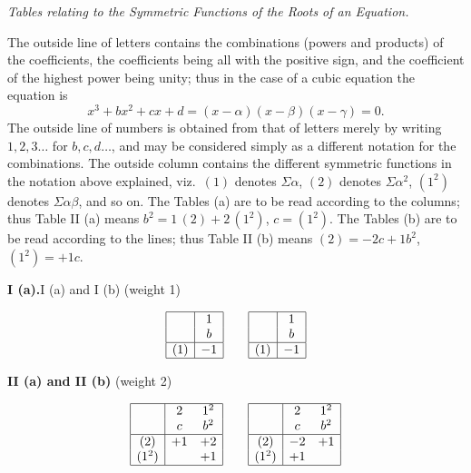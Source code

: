 \documentclass[11pt]{article}
\begin{document}
\bigskip

\begin{center}\textit{Tables relating to the Symmetric Functions of the Roots of an Equation.}\end{center}

\medskip

The outside line of letters contains the combinations (powers and products) of the coefficients, the coefficients being all with the positive sign, and the coefficient of the highest power being unity; thus in the case of a cubic equation the equation is
\[
x^3 + b x^2 + c x + d = (x - \alpha)(x - \beta)(x - \gamma) = 0.
\]
The outside line of numbers is obtained from that of letters merely by writing $1, 2, 3\ldots$ for $b, c, d\ldots$, and may be considered simply as a different notation for the combinations. The outside column contains the different symmetric functions in the notation above explained, viz.\ $(1)$ denotes $\Sigma\alpha$, $(2)$ denotes $\Sigma\alpha^2$, $(1^2)$ denotes $\Sigma\alpha\beta$, and so on. The Tables (a) are to be read according to the columns; thus Table II (a) means $b^2 = 1\,(2) + 2\,(1^2)$, $c = (1^2)$. The Tables (b) are to be read according to the lines; thus Table II (b) means $(2) = -2 c + 1 b^2$, $(1^2) = +1 c$.

\medskip

\begin{center}\textbf{I (a).}\quad I (a) and I (b) (weight 1)\end{center}
\[
\begin{array}{|c|c|}
\hline
   & 1 \\
   & b \\ \hline
(1) & -1 \\ \hline
\end{array}
\qquad
\begin{array}{|c|c|}
\hline
   & 1 \\
   & b \\ \hline
(1) & -1 \\ \hline
\end{array}
\]

\medskip

\begin{center}\textbf{II (a) and II (b)} (weight 2)\end{center}
\[
\begin{array}{|c|cc|}
\hline
   & 2 & 1^2 \\
   & c & b^2 \\ \hline
(2)   & +1 & +2 \\
(1^2) &    & +1 \\ \hline
\end{array}
\qquad
\begin{array}{|c|cc|}
\hline
   & 2 & 1^2 \\
   & c & b^2 \\ \hline
(2)   & -2 & +1 \\
(1^2) & +1 &    \\ \hline
\end{array}
\]
\end{document}
